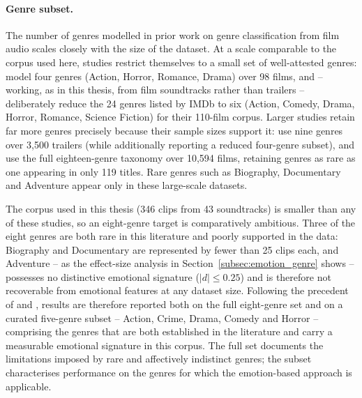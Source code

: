 
\paragraph{Genre subset.}
The number of genres modelled in prior work on genre classification from film audio
scales closely with the size of the dataset. At a scale comparable to the corpus used
here, studies restrict themselves to a small set of well-attested genres:
\citet{austin2010characterization} model four genres (Action, Horror, Romance, Drama)
over 98 films, and \citet{ma2021computational} -- working, as in this thesis, from film
soundtracks rather than trailers -- deliberately reduce the 24 genres listed by IMDb to
six (Action, Comedy, Drama, Horror, Romance, Science Fiction) for their 110-film corpus.
Larger studies retain far more genres precisely because their sample sizes support it:
\citet{behrouzi2023multimodal} use nine genres over 3{,}500 trailers (while additionally
reporting a reduced four-genre subset), and \citet{mangolin2020multimodal} use the full
eighteen-genre taxonomy over 10{,}594 films, retaining genres as rare as one appearing in
only 119 titles. Rare genres such as Biography, Documentary and Adventure appear only in
these large-scale datasets.

The corpus used in this thesis (346 clips from 43 soundtracks) is smaller than any of
these studies, so an eight-genre target is comparatively ambitious. Three of the eight
genres are both rare in this literature and poorly supported in the data: Biography and
Documentary are represented by fewer than 25 clips each, and Adventure -- as the
effect-size analysis in Section~\ref{subsec:emotion_genre} shows -- possesses no
distinctive emotional signature ($|d|\le0.25$) and is therefore not recoverable from
emotional features at any dataset size. Following the precedent of
\citet{ma2021computational} and \citet{austin2010characterization}, results are therefore
reported both on the full eight-genre set and on a curated five-genre subset -- Action,
Crime, Drama, Comedy and Horror -- comprising the genres that are both established in the
literature and carry a measurable emotional signature in this corpus. The full set
documents the limitations imposed by rare and affectively indistinct genres; the subset
characterises performance on the genres for which the emotion-based approach is applicable.
